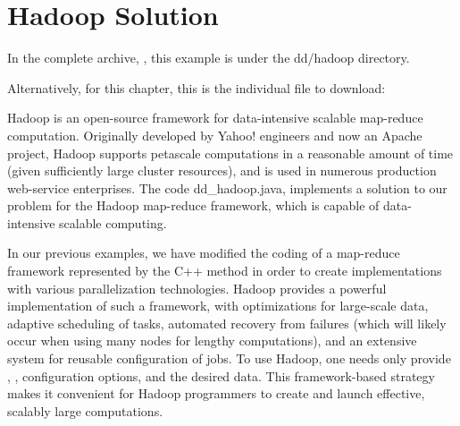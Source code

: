 \documentclass[letterpaper,10pt,openany,oneside]{sphinxmanual}
\begin{document}
\section{Hadoop Solution}
\label{hadoop/hadoop::doc}\label{hadoop/hadoop:hadoop-solution}
In the complete archive, , this example is under the dd/hadoop directory.

Alternatively, for this chapter, this is the individual file to download:


Hadoop is an open-source framework for data-intensive scalable map-reduce computation. Originally developed by Yahoo! engineers and now an Apache project, Hadoop supports petascale computations in a reasonable amount of time (given sufficiently large cluster resources), and is used in numerous production web-service enterprises. The code dd\_hadoop.java, implements a solution to our problem for the Hadoop map-reduce framework, which is capable of data-intensive scalable computing.

In our previous examples, we have modified the coding of a map-reduce framework represented by the C++ method  in order to create implementations with various parallelization technologies. Hadoop provides a powerful implementation of such a framework, with optimizations for large-scale data, adaptive scheduling of tasks, automated recovery from failures (which will likely occur when using many nodes for lengthy computations), and an extensive system for reusable configuration of jobs. To use Hadoop, one needs only provide , , configuration options, and the desired data.  This framework-based strategy makes it convenient for Hadoop programmers to create and launch effective, scalably large computations.
\end{document}
